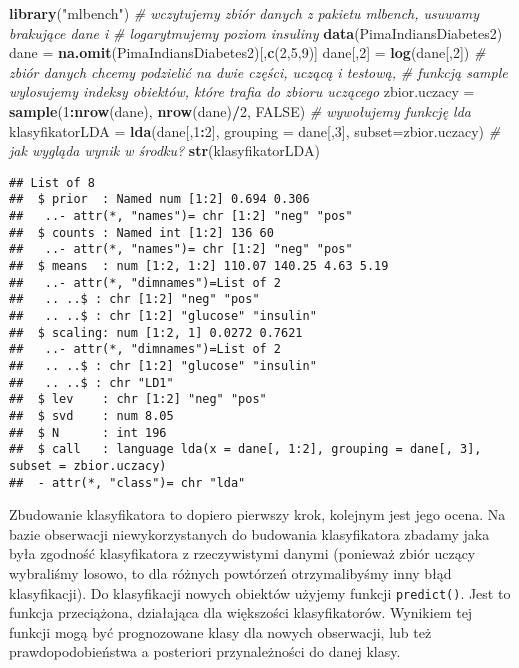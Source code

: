 \documentclass[polish,]{book}
\newenvironment{Shaded}{\begin{snugshade}}{\end{snugshade}}
\newcommand{\CommentTok}[1]{\textcolor[rgb]{0.56,0.35,0.01}{\textit{#1}}}
\newcommand{\DataTypeTok}[1]{\textcolor[rgb]{0.13,0.29,0.53}{#1}}
\newcommand{\DecValTok}[1]{\textcolor[rgb]{0.00,0.00,0.81}{#1}}
\newcommand{\KeywordTok}[1]{\textcolor[rgb]{0.13,0.29,0.53}{\textbf{#1}}}
\newcommand{\NormalTok}[1]{#1}
\newcommand{\OperatorTok}[1]{\textcolor[rgb]{0.81,0.36,0.00}{\textbf{#1}}}
\newcommand{\OtherTok}[1]{\textcolor[rgb]{0.56,0.35,0.01}{#1}}
\newcommand{\StringTok}[1]{\textcolor[rgb]{0.31,0.60,0.02}{#1}}
\begin{document}
\begin{Shaded}
\begin{Highlighting}[]
\KeywordTok{library}\NormalTok{(}\StringTok{"mlbench"}\NormalTok{)}
\CommentTok{# wczytujemy zbiór danych z pakietu mlbench, usuwamy brakujące dane i}
\CommentTok{# logarytmujemy poziom insuliny}
\KeywordTok{data}\NormalTok{(PimaIndiansDiabetes2)}
\NormalTok{dane =}\StringTok{ }\KeywordTok{na.omit}\NormalTok{(PimaIndiansDiabetes2)[,}\KeywordTok{c}\NormalTok{(}\DecValTok{2}\NormalTok{,}\DecValTok{5}\NormalTok{,}\DecValTok{9}\NormalTok{)]}
\NormalTok{dane[,}\DecValTok{2}\NormalTok{] =}\StringTok{ }\KeywordTok{log}\NormalTok{(dane[,}\DecValTok{2}\NormalTok{])}
\CommentTok{# zbiór danych chcemy podzielić na dwie części, uczącą i testową,}
\CommentTok{# funkcją sample wylosujemy indeksy obiektów, które trafia do zbioru uczącego}
\NormalTok{zbior.uczacy =}\StringTok{ }\KeywordTok{sample}\NormalTok{(}\DecValTok{1}\OperatorTok{:}\KeywordTok{nrow}\NormalTok{(dane), }\KeywordTok{nrow}\NormalTok{(dane)}\OperatorTok{/}\DecValTok{2}\NormalTok{, }\OtherTok{FALSE}\NormalTok{)}
\CommentTok{# wywołujemy funkcję lda}
\NormalTok{klasyfikatorLDA =}\StringTok{ }\KeywordTok{lda}\NormalTok{(dane[,}\DecValTok{1}\OperatorTok{:}\DecValTok{2}\NormalTok{], }\DataTypeTok{grouping =}\NormalTok{ dane[,}\DecValTok{3}\NormalTok{], }\DataTypeTok{subset=}\NormalTok{zbior.uczacy)}
\CommentTok{# jak wygląda wynik w środku?}
\KeywordTok{str}\NormalTok{(klasyfikatorLDA)}
\end{Highlighting}
\end{Shaded}

\begin{verbatim}
## List of 8
##  $ prior  : Named num [1:2] 0.694 0.306
##   ..- attr(*, "names")= chr [1:2] "neg" "pos"
##  $ counts : Named int [1:2] 136 60
##   ..- attr(*, "names")= chr [1:2] "neg" "pos"
##  $ means  : num [1:2, 1:2] 110.07 140.25 4.63 5.19
##   ..- attr(*, "dimnames")=List of 2
##   .. ..$ : chr [1:2] "neg" "pos"
##   .. ..$ : chr [1:2] "glucose" "insulin"
##  $ scaling: num [1:2, 1] 0.0272 0.7621
##   ..- attr(*, "dimnames")=List of 2
##   .. ..$ : chr [1:2] "glucose" "insulin"
##   .. ..$ : chr "LD1"
##  $ lev    : chr [1:2] "neg" "pos"
##  $ svd    : num 8.05
##  $ N      : int 196
##  $ call   : language lda(x = dane[, 1:2], grouping = dane[, 3], subset = zbior.uczacy)
##  - attr(*, "class")= chr "lda"
\end{verbatim}

Zbudowanie klasyfikatora to dopiero pierwszy krok, kolejnym jest jego ocena.
Na bazie obserwacji niewykorzystanych do budowania klasyfikatora zbadamy jaka
była zgodność klasyfikatora z rzeczywistymi danymi (ponieważ zbiór uczący wybraliśmy losowo, to dla różnych powtórzeń otrzymalibyśmy inny błąd klasyfikacji).
Do klasyfikacji nowych obiektów użyjemy funkcji \texttt{predict()}. Jest to funkcja przeciążona, działająca dla większości klasyfikatorów. Wynikiem tej funkcji mogą być
prognozowane klasy dla nowych obserwacji, lub też prawdopodobieństwa a posteriori przynależności do danej klasy.
\end{document}
